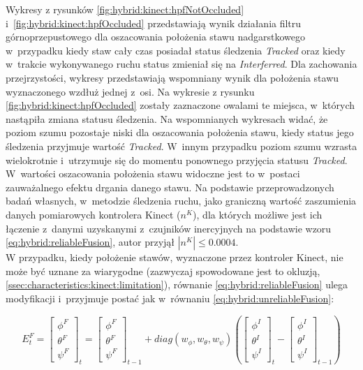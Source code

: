 Wykresy z rysunków \ref{fig:hybrid:kinect:hpfNotOccluded} i~\ref{fig:hybrid:kinect:hpfOccluded} przedstawiają wynik działania filtru górnoprzepustowego dla oszacowania położenia stawu nadgarstkowego w~przypadku kiedy staw cały czas posiadał status śledzenia \emph{Tracked} oraz kiedy w~trakcie wykonywanego ruchu status zmieniał się na \emph{Interferred}. Dla zachowania przejrzystości, wykresy przedstawiają wspomniany wynik dla położenia stawu wyznaczonego wzdłuż jednej z~osi. Na wykresie z rysunku \ref{fig:hybrid:kinect:hpfOccluded} zostały zaznaczone owalami te miejsca, w~których nastąpiła zmiana statusu śledzenia. Na wspomnianych wykresach widać, że poziom szumu pozostaje niski dla oszacowania położenia stawu, kiedy status jego śledzenia przyjmuje wartość \emph{Tracked}. W~innym przypadku poziom szumu wzrasta wielokrotnie i~utrzymuje się do momentu ponownego przyjęcia statusu  \emph{Tracked}. W~wartości oszacowania położenia stawu widoczne jest to w~postaci zauważalnego efektu drgania danego stawu. Na podstawie przeprowadzonych badań własnych, w~metodzie śledzenia ruchu, jako graniczną wartość zaszumienia danych pomiarowych kontrolera Kinect ($n^K$), dla których możliwe jest ich łączenie z~danymi uzyskanymi z~czujników inercyjnych na podstawie wzoru \ref{eq:hybrid:reliableFusion}, autor przyjął $|n^K| \le 0.0004$.\\
																
W przypadku, kiedy położenie stawów, wyznaczone przez kontroler Kinect, nie może być uznane za wiarygodne (zazwyczaj spowodowane jest to okluzją, \ref{ssec:characteristics:kinect:limitation}), równanie \ref{eq:hybrid:reliableFusion} ulega modyfikacji i~przyjmuje postać jak w~równaniu \ref{eq:hybrid:unreliableFusion}: 
																
\begin{equation} 
	\label{eq:hybrid:unreliableFusion}
	E^F_t = 
	\begin{bmatrix}  \phi^F \\  \theta^F \\  \psi^F \end{bmatrix}_t = 
	\begin{bmatrix}  \phi^F \\  \theta^F \\  \psi^F \end{bmatrix}_{t-1} +
	diag(w_\phi,w_\theta,w_\psi)
	(\begin{bmatrix}  \phi^I \\  \theta^I \\  \psi^I \end{bmatrix}_t -
	\begin{bmatrix}  \phi^I \\  \theta^I \\  \psi^I \end{bmatrix}_{t-1})
\end{equation}
																
